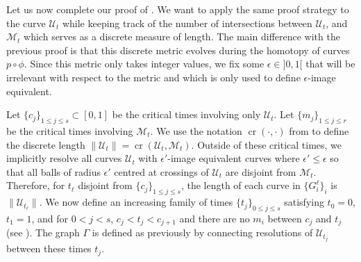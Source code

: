 \documentclass{article}
\newcommand{\cross}{\operatorname{cr}}
\begin{document}
Let us now complete our proof of . We want to apply the same proof strategy to the curve $\mathcal{U}_t$ while keeping track of the number of intersections between $\mathcal{U}_t$, and $\mathcal{M}_t$ which serves as a discrete measure of length. The main difference with the previous proof is that this discrete metric evolves during the homotopy of curves $p \circ \phi$. Since this metric only takes integer values, we fix some $\epsilon \in ]0,1[$ that will be irrelevant with respect to the metric and which is only used to define $\epsilon$-image equivalent. 


Let $\{ c_j \}_{1\leq j \leq s} \subset [0,1]$ be the critical times involving only $\mathcal{U}_t$. Let $\{ m_j \}_{1\leq j \leq r}$ be the critical times involving $\mathcal{M}_t$. We use the notation $\cross (\cdot, \cdot)$ from  to define the discrete length $ \| \mathcal{U}_t \| = \cross ( \mathcal{U}_t, \mathcal{M}_t )$. Outside of these critical times, we implicitly resolve all curves $\mathcal{U}_t$ with $\epsilon '$-image equivalent curves where $\epsilon ' \leq \epsilon$ so that all balls of radius $\epsilon '$ centred at crossings of $\mathcal{U}_t$ are disjoint from $\mathcal{M}_t$. Therefore, for $t_\ell$ disjoint from $\{ c_j \}_{1\leq j \leq s}$, the length of each curve in $\{ G^\ell_i\}_i$ is $\| \mathcal{U}_{t_\ell} \|$. We now define an increasing family of times $\{ t_j \}_{0 \leq j \leq s}$ satisfying $t_0 = 0$, $t_1 = 1$, and for $0 < j < s$, $ c_j < t_{j} < c_{j+1} $ and there are no $m_i$ between $c_j$ and $t_{j}$ (see ). The graph $\Gamma$ is defined as previously by connecting resolutions of $\mathcal{U}_{t_j}$ between these times $t_j$.
\end{document}
